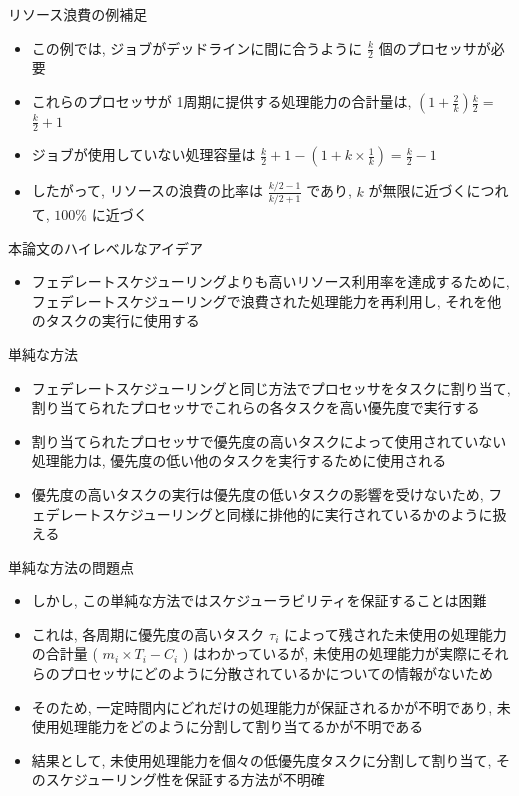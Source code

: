 \begin{frame}{リソース浪費の例補足}
    \begin{itemize}
        \item この例では, ジョブがデッドラインに間に合うように $\frac{k}{2}$ 個のプロセッサが必要
        \item これらのプロセッサが 1周期に提供する処理能力の合計量は, $\left(1+\frac{2}{k}\right) \frac{k}{2}=$  $\frac{k}{2}+1$
        \item ジョブが使用していない処理容量は $\frac{k}{2}+1-\left(1+k \times \frac{1}{k}\right)=\frac{k}{2}-1$
        \item したがって, リソースの浪費の比率は $\frac{k / 2-1}{k / 2+1}$ であり, $k$ が無限に近づくにつれて, $100 \%$ に近づく
    \end{itemize}
\end{frame}

\begin{frame}{本論文のハイレベルなアイデア}
    \begin{itemize}
        \item フェデレートスケジューリングよりも高いリソース利用率を達成するために, フェデレートスケジューリングで浪費された処理能力を再利用し, それを他のタスクの実行に使用する
    \end{itemize}
\end{frame}

\begin{frame}{単純な方法}
    \begin{itemize}
        \item フェデレートスケジューリングと同じ方法でプロセッサをタスクに割り当て, 割り当てられたプロセッサでこれらの各タスクを高い優先度で実行する
        \item 割り当てられたプロセッサで優先度の高いタスクによって使用されていない処理能力は, 優先度の低い他のタスクを実行するために使用される
        \item 優先度の高いタスクの実行は優先度の低いタスクの影響を受けないため, フェデレートスケジューリングと同様に排他的に実行されているかのように扱える
    \end{itemize}
\end{frame}

\begin{frame}{単純な方法の問題点}
    \begin{itemize}
        \item しかし, この単純な方法ではスケジューラビリティを保証することは困難
        \item これは, 各周期に優先度の高いタスク $\tau_{i}$ によって残された未使用の処理能力の合計量 ( $m_{i} \times T_{i}-C_{i}$ ) はわかっているが, 未使用の処理能力が実際にそれらのプロセッサにどのように分散されているかについての情報がないため
        \item そのため, 一定時間内にどれだけの処理能力が保証されるかが不明であり, 未使用処理能力をどのように分割して割り当てるかが不明である
        \item 結果として, 未使用処理能力を個々の低優先度タスクに分割して割り当て, そのスケジューリング性を保証する方法が不明確
    \end{itemize}
\end{frame}

